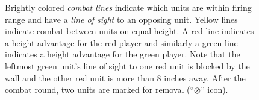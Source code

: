 \documentclass[10pt,twocolumn,letterpaper]{article}
\begin{document}
\begin{figure}[b]
\caption{Brightly colored {\em combat lines} indicate which units are
  within firing range and have a {\em line of sight} to an opposing
  unit.  Yellow lines indicate combat between units on equal height.
  A red line indicates a height advantage for the red player and
  similarly a green line indicates a height advantage for the green
  player.  Note that the leftmost green unit's line of sight to one
  red unit is blocked by the wall and the other red unit is more than
  8 inches away.  After the combat round, two units are marked for removal (``$\otimes$'' icon).
}
\label{FIGURE:CombatExamples}
\end{figure}


\end{document}
